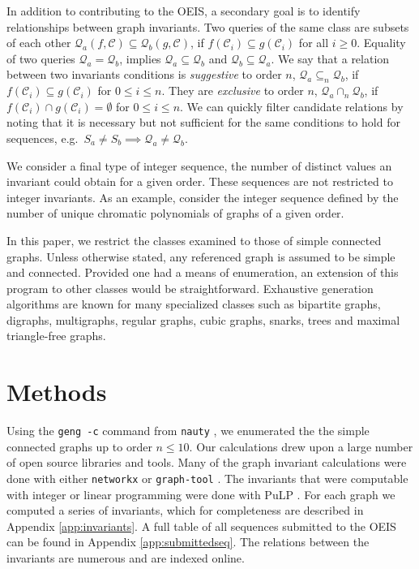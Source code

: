 \documentclass[12pt]{article}
\newcommand{\SEQ}{S}
\newcommand{\QUERY}{\mathcal{Q}}
\newcommand{\CLASS}{\mathcal{C}}
\newcommand{\eg}[0]{e.g.\ }
\begin{document}
In addition to contributing to the OEIS, a secondary goal is to identify relationships between graph invariants.
Two queries of the same class are subsets of each other $\QUERY_a(f,\CLASS) \subseteq \QUERY_b(g, \CLASS)$, if $f(\CLASS_i) \subseteq g(\CLASS_i)$ for all $i\ge0$. 
Equality of two queries $\QUERY_a = \QUERY_b$, implies $\QUERY_a \subseteq \QUERY_b$ and $\QUERY_b \subseteq \QUERY_a$. 
We say that a relation between two invariants conditions is \textit{suggestive} to order $n$, $\QUERY_a \subseteq_n \QUERY_b$, if $f(\CLASS_i) \subseteq g(\CLASS_i)$ for $0 \le i \le n$.
They are \textit{exclusive} to order $n$, $\QUERY_a \cap_n \QUERY_b$, if $f(\CLASS_i) \cap g(\CLASS_i) = \emptyset$ for $0 \le i \le n$.
We can quickly filter candidate relations by noting that it is necessary but not sufficient for the same conditions to hold for sequences, \eg $\SEQ_a \ne \SEQ_b \implies  \QUERY_a \ne \QUERY_b$.

We consider a final type of integer sequence, the number of distinct values an invariant could obtain for a given order.
These sequences are not restricted to integer invariants. 
As an example, consider the integer sequence defined by the number of unique chromatic polynomials of graphs of a given order.

In this paper, we restrict the classes examined to those of simple connected graphs.
Unless otherwise stated, any referenced graph is assumed to be simple and connected.
Provided one had a means of enumeration, an extension of this program to other classes would be straightforward.
Exhaustive generation algorithms are known for many specialized classes such as bipartite graphs, digraphs, multigraphs, regular graphs, cubic graphs, snarks, trees and maximal triangle-free graphs\cite{mckay2014practical, meringer1999fast, brinkmann1996fast, brinkmann2013generation, sawada2006generating, brandt2000generation}. 

\section{Methods}

Using the \texttt{geng -c} command from \texttt{nauty} \cite{mckay2014practical}, we enumerated the the simple connected graphs up to order $n \le 10$.
Our calculations drew upon a large number of open source libraries and tools. 
Many of the graph invariant calculations were done with either \texttt{networkx} \cite{SciPyProceedings_11} or \texttt{graph-tool} \cite{Tiago2014graph}.
The invariants that were computable with integer or linear programming were done with PuLP \cite{mitchell2011pulp}.
For each graph we computed a series of invariants, which for completeness are described in Appendix \ref{app:invariants}.
A full table of all sequences submitted to the OEIS can be found in Appendix \ref{app:submittedseq}.
The relations between the invariants are numerous and are indexed online\cite{Travis2014Encyclopdia}.
\end{document}

